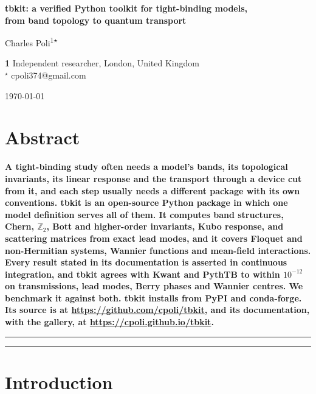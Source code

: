 \documentclass[submission, Phys]{SciPost}
\begin{document}
\begin{center}{\Large \textbf{
tbkit: a verified Python toolkit for tight-binding models,\\
from band topology to quantum transport
}}\end{center}

\begin{center}
Charles Poli\textsuperscript{1$\star$}
\end{center}

\begin{center}
{\bf 1} Independent researcher, London, United Kingdom
\\
${}^\star$ {\small \sf cpoli374@gmail.com}
\end{center}

\begin{center}
\today
\end{center}

\section*{Abstract}
{\bf
A tight-binding study often needs a model's bands, its topological
invariants, its linear response and the transport through a device cut
from it, and each step usually needs a different package with its own
conventions. tbkit is an open-source Python package in which one model
definition serves all of them. It computes band structures, Chern,
$\mathbb{Z}_2$, Bott and higher-order invariants, Kubo response, and
scattering matrices from exact lead modes, and it covers Floquet and
non-Hermitian systems, Wannier functions and mean-field interactions.
Every result stated in its documentation is asserted in continuous
integration, and tbkit agrees with Kwant and PythTB to within $10^{-12}$
on transmissions, lead modes, Berry phases and Wannier centres. We
benchmark it against both. tbkit installs from PyPI and
conda-forge. Its source is at \url{https://github.com/cpoli/tbkit}, and its
documentation, with the gallery, at \url{https://cpoli.github.io/tbkit}.
}

\vspace{10pt}
\noindent\rule{\textwidth}{1pt}
\tableofcontents\thispagestyle{fancy}
\noindent\rule{\textwidth}{1pt}
\vspace{10pt}

\section{Introduction}
\label{sec:intro}
\end{document}
